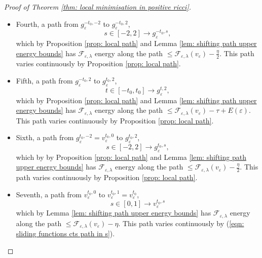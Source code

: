 \documentclass[11pt]{article}
\begin{document}
\begin{proof}[Proof of Theorem \ref{thm: local minimisation in positive ricci}]
\begin{itemize}
    \item Fourth, a path from $g^{-t_0,-2}_\varepsilon$ to $g^{-t_0,2}_\varepsilon$,
    \begin{equation*}
    s \in [-2,2] \rightarrow g^{-t_0,s}_\varepsilon,
    \end{equation*}
    which by Proposition \ref{prop: local path} and Lemma \ref{lem: shifting path upper energy bounds} has $\mathcal{F}_{\varepsilon,\lambda}$ energy along the path $\leq \mathcal{F}_{\varepsilon,\lambda}(v_\varepsilon) -  \frac{\eta}{2}$. This path varies continuously by Proposition \ref{prop: local path}.

    \item Fifth, a path from $g^{-t_0,2}_\varepsilon$ to $g^{t_0,2}_\varepsilon$,
    \begin{equation*}
    t \in [-t_0,t_0] \rightarrow g^{t,2}_\varepsilon,
    \end{equation*}
    which by Proposition \ref{prop: local path} and Lemma \ref{lem: shifting path upper energy bounds} has $\mathcal{F}_{\varepsilon,\lambda}$ energy along the path $\leq \mathcal{F}_{\varepsilon,\lambda}(v_\varepsilon) - \tau + E(\varepsilon)$. This path varies continuously by Proposition \ref{prop: local path}.


    \item Sixth, a path from $g^{t_0,-2}_\varepsilon = v^{t_0,0}_\varepsilon$ to $g^{t_0,2}_\varepsilon$,
    \begin{equation*}
    s \in [-2,2] \rightarrow g^{t_0,s}_\varepsilon,
    \end{equation*}
    which by  by Proposition \ref{prop: local path} and Lemma \ref{lem: shifting path upper energy bounds} has $\mathcal{F}_{\varepsilon,\lambda}$ energy along the path $\leq \mathcal{F}_{\varepsilon,\lambda}(v_\varepsilon) - \frac{\eta}{2}$. This path varies continuously by Proposition \ref{prop: local path}.

    \item Seventh, a path from         $v^{t_0,0}_\varepsilon$ to $v^{t_0,1}_\varepsilon = v^{t_0}_
    \varepsilon$,
    \begin{equation*}
    s \in [0,1] \rightarrow v^{t_0,s}_\varepsilon
    \end{equation*}
    which by Lemma \ref{lem: shifting path upper energy bounds} has $\mathcal{F}_{\varepsilon,\lambda}$ energy along the path $\leq \mathcal{F}_{\varepsilon,\lambda}(v_\varepsilon) -  \eta$. This path varies continuously by (\ref{eqn: sliding functions cts path in s}).


\end{itemize}
\end{proof}
\end{document}
